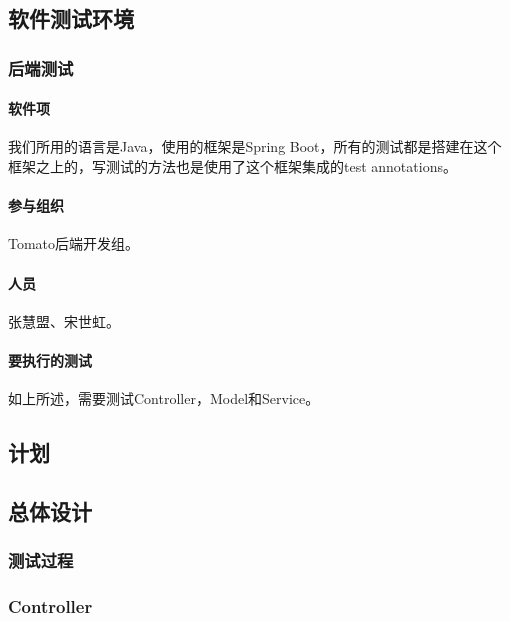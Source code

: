 \documentclass{article}
\begin{document}
\subsection{软件测试环境}
\subsubsection{后端测试}
\paragraph{软件项}
	我们所用的语言是Java，使用的框架是Spring Boot，所有的测试都是搭建在这个框架之上的，写测试的方法也是使用了这个框架集成的test annotations。
\paragraph{参与组织}
	Tomato后端开发组。
\paragraph{人员}
	张慧盟、宋世虹。
\paragraph{要执行的测试}
	如上所述，需要测试Controller，Model和Service。
\subsection{计划}
\subsection{总体设计}
\subsubsection{测试过程}
	\subsubsection{Controller}
\end{document}
